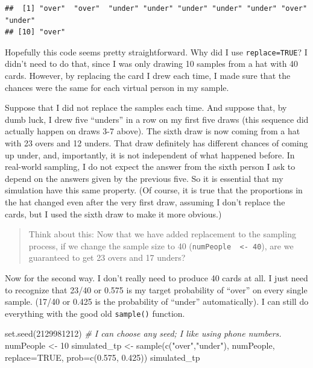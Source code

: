 \documentclass[
  openany]{book}
\newenvironment{Shaded}{\begin{snugshade}}{\end{snugshade}}
\newcommand{\AttributeTok}[1]{\textcolor[rgb]{0.77,0.63,0.00}{#1}}
\newcommand{\CommentTok}[1]{\textcolor[rgb]{0.56,0.35,0.01}{\textit{#1}}}
\newcommand{\ConstantTok}[1]{\textcolor[rgb]{0.00,0.00,0.00}{#1}}
\newcommand{\DecValTok}[1]{\textcolor[rgb]{0.00,0.00,0.81}{#1}}
\newcommand{\FloatTok}[1]{\textcolor[rgb]{0.00,0.00,0.81}{#1}}
\newcommand{\FunctionTok}[1]{\textcolor[rgb]{0.00,0.00,0.00}{#1}}
\newcommand{\NormalTok}[1]{#1}
\newcommand{\OtherTok}[1]{\textcolor[rgb]{0.56,0.35,0.01}{#1}}
\newcommand{\StringTok}[1]{\textcolor[rgb]{0.31,0.60,0.02}{#1}}
\begin{document}
\begin{verbatim}
##  [1] "over"  "over"  "under" "under" "under" "under" "under" "over"  "under"
## [10] "over"
\end{verbatim}

Hopefully this code seems pretty straightforward. Why did I use \texttt{replace=TRUE}? I didn't need to do that, since I was only drawing 10 samples from a hat with 40 cards. However, by replacing the card I drew each time, I made sure that the chances were the same for each virtual person in my sample.

Suppose that I did not replace the samples each time. And suppose that, by dumb luck, I drew five ``unders'' in a row on my first five draws (this sequence did actually happen on draws 3-7 above). The sixth draw is now coming from a hat with 23 overs and 12 unders. That draw definitely has different chances of coming up under, and, importantly, it is not independent of what happened before. In real-world sampling, I do not expect the answer from the sixth person I ask to depend on the answers given by the previous five. So it is essential that my simulation have this same property. (Of course, it is true that the proportions in the hat changed even after the very first draw, assuming I don't replace the cards, but I used the sixth draw to make it more obvious.)

\begin{quote}
Think about this: Now that we have added replacement to the sampling process, if we change the sample size to 40 (\texttt{numPeople\ \ \textless{}-\ 40}), are we guaranteed to get 23 overs and 17 unders?
\end{quote}

Now for the second way. I don't really need to produce 40 cards at all. I just need to recognize that 23/40 or 0.575 is my target probability of ``over'' on every single sample. (17/40 or 0.425 is the probability of ``under'' automatically). I can still do everything with the good old \texttt{sample()} function.

\begin{Shaded}
\begin{Highlighting}[]
\FunctionTok{set.seed}\NormalTok{(}\DecValTok{2129981212}\NormalTok{) }\CommentTok{\# I can choose any seed; I like using phone numbers.}
\NormalTok{numPeople }\OtherTok{\textless{}{-}} \DecValTok{10}
\NormalTok{simulated\_tp }\OtherTok{\textless{}{-}} \FunctionTok{sample}\NormalTok{(}\FunctionTok{c}\NormalTok{(}\StringTok{"over"}\NormalTok{,}\StringTok{"under"}\NormalTok{), numPeople, }\AttributeTok{replace=}\ConstantTok{TRUE}\NormalTok{, }\AttributeTok{prob=}\FunctionTok{c}\NormalTok{(}\FloatTok{0.575}\NormalTok{, }\FloatTok{0.425}\NormalTok{))}
\NormalTok{simulated\_tp}
\end{Highlighting}
\end{Shaded}
\end{document}
